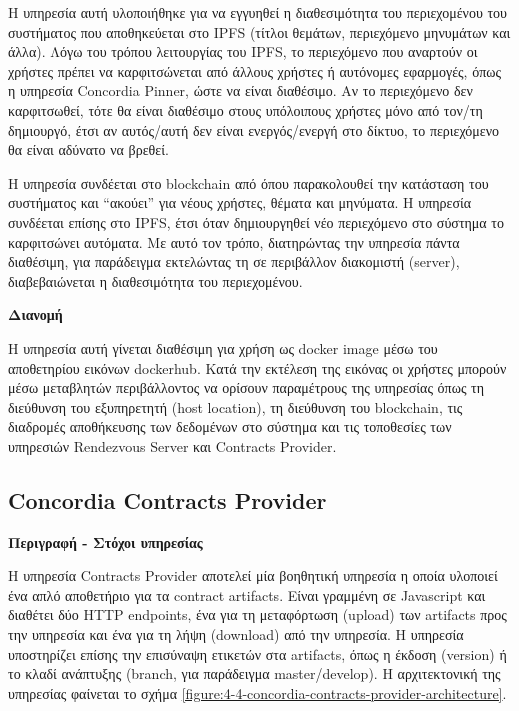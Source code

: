 Η υπηρεσία αυτή υλοποιήθηκε για να εγγυηθεί η διαθεσιμότητα του περιεχομένου του συστήματος που αποθηκεύεται στο IPFS (τίτλοι θεμάτων, περιεχόμενο μηνυμάτων και άλλα). Λόγω του τρόπου λειτουργίας %
του IPFS, το περιεχόμενο που αναρτούν οι χρήστες πρέπει να καρφιτσώνεται από άλλους χρήστες ή αυτόνομες εφαρμογές, όπως η υπηρεσία Concordia Pinner, ώστε να είναι διαθέσιμο. Αν το περιεχόμενο δεν καρφιτσωθεί, τότε θα είναι διαθέσιμο στους υπόλοιπους χρήστες μόνο από %
τον/τη δημιουργό, έτσι αν αυτός/αυτή δεν είναι ενεργός/ενεργή στο δίκτυο, το περιεχόμενο θα είναι αδύνατο να βρεθεί.

Η υπηρεσία συνδέεται στο blockchain από όπου παρακολουθεί την κατάσταση του συστήματος και ``ακούει'' για νέους χρήστες, θέματα και μηνύματα. Η υπηρεσία συνδέεται επίσης στο IPFS, έτσι όταν δημιουργηθεί νέο περιεχόμενο στο σύστημα το καρφιτσώνει αυτόματα. Με αυτό τον τρόπο, διατηρώντας την υπηρεσία πάντα διαθέσιμη, για παράδειγμα εκτελώντας τη σε περιβάλλον διακομιστή (server), διαβεβαιώνεται η διαθεσιμότητα του περιεχομένου.

\vspace{0.5cm}
\textbf{Διανομή}

Η υπηρεσία αυτή γίνεται διαθέσιμη για χρήση ως docker image μέσω του αποθετηρίου εικόνων dockerhub. Κατά την εκτέλεση της εικόνας οι χρήστες μπορούν μέσω μεταβλητών περιβάλλοντος να ορίσουν παραμέτρους της υπηρεσίας όπως τη διεύθυνση του εξυπηρετητή (host location), τη διεύθυνση του blockchain, τις διαδρομές αποθήκευσης των δεδομένων στο σύστημα και τις τοποθεσίες των υπηρεσιών Rendezvous Server και Contracts Provider.

\subsection{Concordia Contracts Provider} \label{subsection:4-4-concordia-contracts-provider-service}

\vspace{0.5cm}
\textbf{Περιγραφή - Στόχοι υπηρεσίας}

Η υπηρεσία Contracts Provider αποτελεί μία βοηθητική υπηρεσία η οποία υλοποιεί ένα απλό αποθετήριο για τα contract artifacts. Είναι γραμμένη σε Javascript και διαθέτει δύο HTTP \textenglish{endpoints}, ένα για τη μεταφόρτωση (upload) των artifacts προς την υπηρεσία και ένα για τη λήψη (download) από την υπηρεσία. Η υπηρεσία υποστηρίζει επίσης την επισύναψη ετικετών στα artifacts, όπως η έκδοση (version) ή το κλαδί ανάπτυξης (branch, για παράδειγμα \textenglish{master/develop}). Η αρχιτεκτονική της υπηρεσίας φαίνεται το σχήμα \ref{figure:4-4-concordia-contracts-provider-architecture}.

